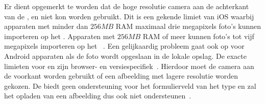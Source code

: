 Er dient opgemerkt te worden dat de hoge resolutie camera aan de achterkant van de \ipadiii{}, \iphoneiii{} en \iphoneiv{} niet kon worden gebruikt.
Dit is een gekende limiet van iOS waarbij apparaten met minder dan $256\unit{MB}$ RAM maximaal drie megapixels foto's kunnen importeren op het .
Apparaten met $256\unit{MB}$ RAM of meer kunnen foto's tot vijf megapixels importeren op het ~\cite{Apple2012}.
Een gelijkaardig probleem gaat ook op voor Android apparaten als de foto wordt opgeslaan in de lokale opslag.
De exacte limieten voor  en  zijn browser- en versiespecifiek~\cite{Gonzalez2012}.
Hierdoor moet de camera aan de voorkant worden gebruikt of een afbeelding met lagere resolutie worden gekozen.
De \ipadi{} biedt geen ondersteuning voor het formulierveld van het type  en zal het opladen van een afbeelding dus ook niet ondersteunen~\cite{ViljamiSalminen2012}.

% 
% 
% 
% 

